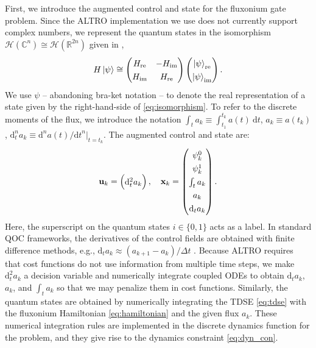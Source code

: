 First, we introduce the augmented control and state for the fluxonium gate problem.
Since the ALTRO implementation we use does not currently
support complex numbers, we represent the quantum states
in the isomorphism $\mathcal{H}(\mathbb{C}^{n})
\cong \mathcal{H}(\mathbb{R}^{2n})$ given in \cite{leung2017speedup},
\begin{equation}
  H \ket{\psi} \cong \begin{pmatrix} H_{\textrm{re}} & -H_{\textrm{im}}
    \\ H_{\textrm{im}} & H_{\textrm{re}}\end{pmatrix}
  \begin{pmatrix} \ket{\psi}_{\textrm{re}} \\ \ket{\psi}_{\textrm{im}}\end{pmatrix}.
  \label{eq:isomorphism}
\end{equation}
We use $\psi$ -- abandoning bra-ket notation -- to denote the real representation of a state
given by the right-hand-side of \eqref{eq:isomorphism}.
To refer to the discrete moments of the flux, we introduce the notation
$\int_{t} a_{k} \equiv \int^{t_{k}}_{t_{1}} a(t) \ \mathrm{d}t$,
$a_{k} \equiv a(t_{k})$,
$\mathrm{d}^{n}_{t} a_{k} \equiv \mathrm{d}^{n}a(t)/{\mathrm{d}t}^{n} \lvert_{t = t_{k}}$.
The augmented control and state are:
\begin{equation}
  \begingroup
  \renewcommand*{\arraystretch}{1.3}
  \mathbf{u}_{k} = \begin{pmatrix} \mathrm{d}^{2}_{t} a_{k} \end{pmatrix}, \quad
  \mathbf{x}_{k} = \begin{pmatrix} \psi^{0}_{k} \\ \psi^{1}_{k}
    \\ \int_{t} a_{k} \\ a_{k} \\ \mathrm{d}_{t} a_{k} \end{pmatrix}.
  \endgroup
  \label{eq:astatecontrols}
\end{equation}
Here, the superscript on the quantum states $i \in \{0, 1\}$ acts as a label.
In standard QOC frameworks, the derivatives of the control fields
are obtained with finite difference methods, e.g.,
$\mathrm{d}_{t} a_{k} \approx (a_{k + 1} - a_{k}) / \Delta t$ \cite{leung2017speedup}.
Because ALTRO requires that cost functions do not use information from multiple time steps,
we make $\mathrm{d}^{2}_{t} a_{k}$ a decision variable and
numerically integrate coupled ODEs to obtain $\mathrm{d}_{t} a_{k}$, $a_{k}$, and $\int_{t} a_{k}$
so that we may penalize them in cost functions.
Similarly, the quantum states are obtained by numerically integrating
the TDSE \eqref{eq:tdse} with the fluxonium Hamiltonian \eqref{eq:hamiltonian}
and the given flux $a_{k}$. These numerical integration rules are implemented
in the discrete dynamics function for the problem, and they give rise to the
dynamics constraint \eqref{eq:dyn_con}.

